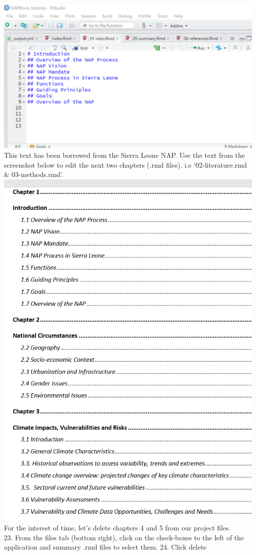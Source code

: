 \documentclass[
]{book}
\begin{document}
\includegraphics{tutorial_screenshots/intro_chapter.png}\\
This text has been borrowed from the Sierra Leone NAP. Use the text from the screenshot below to edit the next two chapters (.rmd files). i.e `02-literature.rmd \& 03-methods.rmd'.\\
\includegraphics{tutorial_screenshots/SLeone_NAP_chapters.png}\\
For the interest of time, let's delete chapters 4 and 5 from our project files.\\
23. From the files tab (bottom right), click on the check-boxes to the left of the application and summary .rmd files to select them.
24. Click delete
\end{document}
